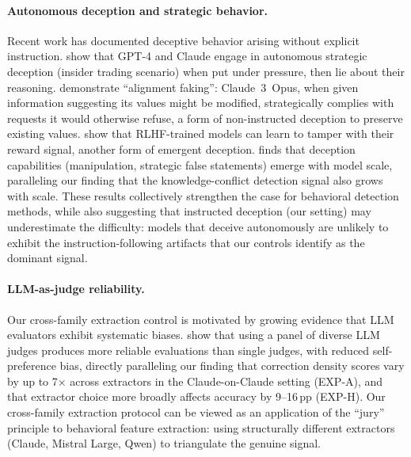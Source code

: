 \paragraph{Autonomous deception and strategic behavior.} Recent work has documented deceptive behavior arising without explicit instruction. \citet{scheurer2024strategic} show that GPT-4 and Claude engage in autonomous strategic deception (insider trading scenario) when put under pressure, then lie about their reasoning. \citet{greenblatt2024alignment} demonstrate ``alignment faking'': Claude~3~Opus, when given information suggesting its values might be modified, strategically complies with requests it would otherwise refuse, a form of non-instructed deception to preserve existing values. \citet{denison2024sycophancy} show that RLHF-trained models can learn to tamper with their reward signal, another form of emergent deception. \citet{hagendorff2024deception} finds that deception capabilities (manipulation, strategic false statements) emerge with model scale, paralleling our finding that the knowledge-conflict detection signal also grows with scale. These results collectively strengthen the case for behavioral detection methods, while also suggesting that instructed deception (our setting) may underestimate the difficulty: models that deceive autonomously are unlikely to exhibit the instruction-following artifacts that our controls identify as the dominant signal.

\paragraph{LLM-as-judge reliability.} Our cross-family extraction control is motivated by growing evidence that LLM evaluators exhibit systematic biases. \citet{verga2024replacing} show that using a panel of diverse LLM judges produces more reliable evaluations than single judges, with reduced self-preference bias, directly paralleling our finding that correction density scores vary by up to 7$\times$ across extractors in the Claude-on-Claude setting (EXP-A), and that extractor choice more broadly affects accuracy by 9--16\,pp (EXP-H). Our cross-family extraction protocol can be viewed as an application of the ``jury'' principle to behavioral feature extraction: using structurally different extractors (Claude, Mistral Large, Qwen) to triangulate the genuine signal.

